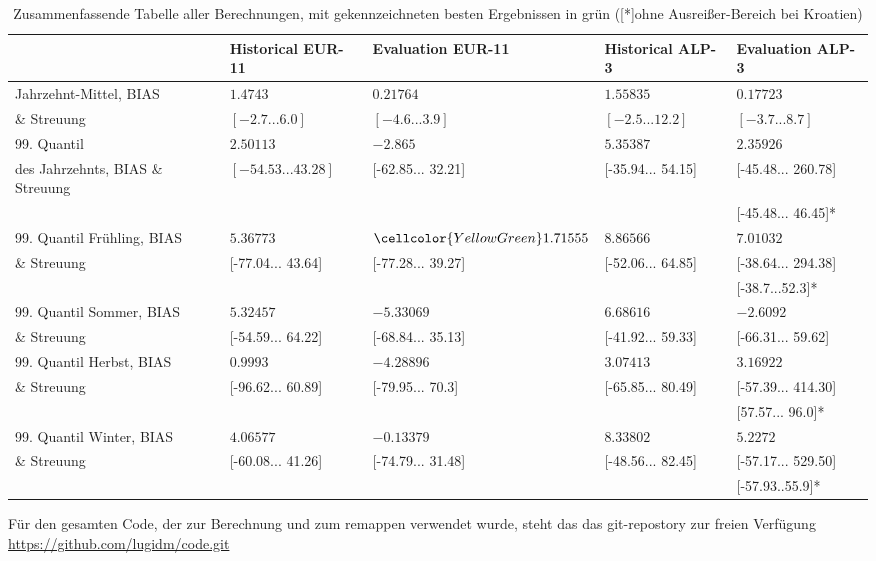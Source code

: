 \begin{table}[h!]
	\begin{tabularx}{\textwidth}{X|X|X|X|X|}
		\cline{2-5}
		& \textbf{Historical EUR-11} & \textbf{Evaluation EUR-11}& \textbf{Historical ALP-3} & \textbf{Evaluation ALP-3}\\
		\hline
		Jahrzehnt-Mittel, BIAS& $1.4743$ & $0.21764$ & $1.55835$ & \cellcolor{YellowGreen}$0.17723$\\
		\cline{2-5} \& Streuung& $[-2.7...6.0]$ & \cellcolor{YellowGreen}$[-4.6...3.9]$ &$[-2.5...12.2]$& $[-3.7...8.7]$\\
		\hline\hline
		99. Quantil& $2.50113$ & $-2.865$ & $5.35387$&\cellcolor{YellowGreen}$2.35926$\\
		\cline{2-5} des Jahrzehnts, BIAS \& Streuung& $[-54.53...43.28]$ &[-62.85... 32.21] &\cellcolor{YellowGreen}[-35.94... 54.15]& [-45.48... 260.78]\\
		\cline{5-5}
		&&&\cellcolor{YellowGreen}&[-45.48... 46.45]* \\
		\hline\hline
		99. Quantil Frühling, BIAS& $5.36773$ & $\cellcolor{YellowGreen}1.71555$ & $8.86566$&$7.01032$\\
		\cline{2-5} \& Streuung	& [-77.04... 43.64] & \cellcolor{YellowGreen}[-77.28... 39.27] & [-52.06... 64.85] & [-38.64... 294.38]\\
		\cline{5-5}&&&&\cellcolor{YellowGreen}[-38.7...52.3]*\\
		\hline
		99. Quantil Sommer, BIAS & $5.32457$ & $-5.33069$ & $6.68616$&\cellcolor{YellowGreen}$-2.6092$\\
		\cline{2-5}  \& Streuung & [-54.59... 64.22] & [-68.84... 35.13] & \cellcolor{YellowGreen}[-41.92... 59.33] & [-66.31... 59.62]\\
		\hline
		99. Quantil Herbst, BIAS & \cellcolor{YellowGreen}$0.9993$ & $-4.28896$ & $3.07413$&$3.16922$\\
		\cline{2-5}\& Streuung& [-96.62... 60.89]& [-79.95... 70.3] & \cellcolor{YellowGreen}[-65.85... 80.49]& [-57.39... 414.30]\\
		\cline{5-5}&&&&[57.57... 96.0]*\\
		\hline
		99. Quantil Winter, BIAS& \cellcolor{YellowGreen}$4.06577$ & $-0.13379$ & $8.33802$&$5.2272$\\
		\cline{2-5}\& Streuung & [-60.08... 41.26] & \cellcolor{YellowGreen}[-74.79... 31.48] & [-48.56... 82.45] & [-57.17... 529.50]\\
		\cline{5-5}&&&&[-57.93..55.9]*\\
		\hline
	\end{tabularx}
	\caption{Zusammenfassende Tabelle aller Berechnungen, mit gekennzeichneten besten Ergebnissen in grün ([*]ohne Ausreißer-Bereich bei Kroatien)}
	\label{tab:appendix}
\end{table}

Für den gesamten Code, der zur Berechnung und zum remappen verwendet wurde, steht das das git-repostory zur freien Verfügung \href{https://github.com/lugidm/code.git}{https://github.com/lugidm/code.git}